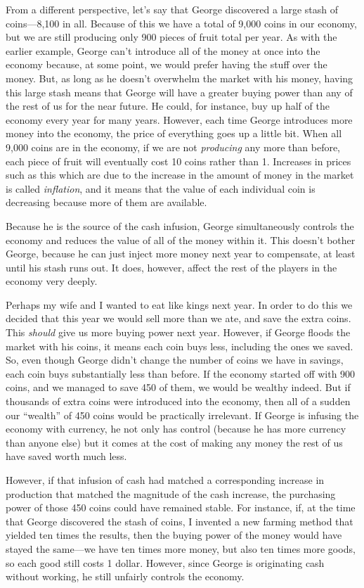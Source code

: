 From a different perspective, let’s say that George discovered
a large stash of
coins---8,100 in all. Because of this we have a total of 9,000 coins in our economy,
but we are still producing only 900 pieces of fruit total per year. As with the earlier
example, George can’t introduce all of the money at once into the
economy because, at some point, we would prefer having the stuff over
the money. But, as long as he doesn't overwhelm the market with his money,
having this large stash means that George will have a
greater buying power than any of the rest of us for the near future. He could, for instance,
buy up half of the economy every year for many years.  However, each time George introduces
more money into the economy, the price of everything goes up a little bit.
When all 9,000 coins are in the economy, if we are not \textit{producing}
any more than before, each piece of fruit will eventually cost 10 coins
rather than 1.  Increases in prices such as this which are due to the increase in the 
amount of money in the market is called \textit{inflation}, and it means that the value
of each individual coin is decreasing because more of them are available.

Because he is the source of the cash infusion, George simultaneously 
controls the economy and reduces the value of all of the money within it.
This doesn't bother George, because he can just inject more money next year to compensate,
at least until his stash runs out.  It does, however, affect the rest of the 
players in the economy very deeply.

Perhaps my wife and I wanted to eat like kings next year.  In order to do this we
decided that this year we would sell more than we ate, and save the
extra coins. This \textit{should} give us more buying power next year. However, if
George floods the market with his coins, it means each coin buys less, including
the ones we saved.
So, even though George didn't change the number of coins we have in savings, each coin
buys substantially less than before. If the economy started off with 900 coins, and
we managed to save 450 of them, we would be wealthy indeed. But if
thousands of extra coins were introduced into the economy, then all of a
sudden our ``wealth'' of 450 coins would be practically irrelevant. If
George is infusing the economy with currency, he not only has control
(because he has more currency than anyone else) but it comes at the
cost of making any money the rest of us have saved worth much less. 

However, if that infusion of cash had matched a corresponding increase
in production that matched the magnitude of the cash increase, the
purchasing power of those 450 coins could have remained stable.  
For instance, if, at the time that George discovered the stash of coins,
I invented a new farming method that yielded ten times the results, then
the buying power of the money would have stayed the same---we have ten times
more money, but also ten times more goods, so each good still costs 1 dollar.  
However, since George is originating cash without working, he still unfairly
controls the economy.

